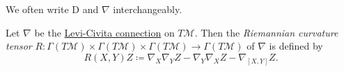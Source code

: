 \begin{notation}
	We often write \(\mathrm{D} \) and \(\nabla \) interchangeably.
\end{notation}

\begin{definition}\label{def:Riemannian-curvature-tensor}
	Let \(\nabla \) be the \hyperref[def:Levi-Civita-connection]{Levi-Civita connection} on \(T \mathcal{M} \). Then the \emph{Riemannian curvature tensor} \(R\colon \Gamma (T \mathcal{M} ) \times \Gamma (T \mathcal{M} )\times \Gamma (T \mathcal{M} ) \to \Gamma (T \mathcal{M} )\) of \(\nabla \) is defined by
	\[
		R(X, Y)Z \coloneqq \nabla _X \nabla _Y Z - \nabla _Y \nabla _X Z - \nabla _{[X, Y]}Z.
	\]
\end{definition}